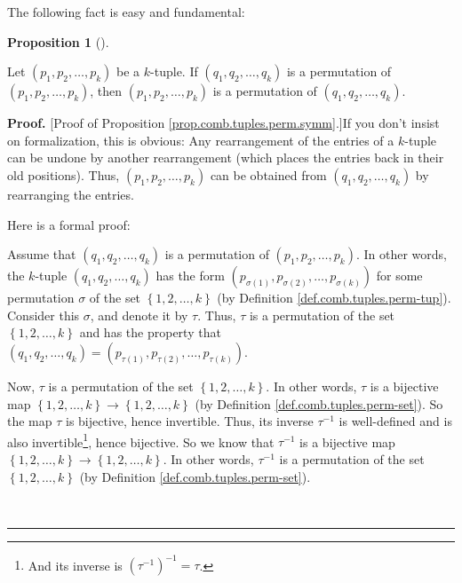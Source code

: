 \documentclass[numbers=enddot,12pt,final,onecolumn,notitlepage]{scrartcl}%
\numberwithin{exer}{subsection}
\theoremstyle{definition}
\newtheorem{prop}[theo]{Proposition}
\newenvironment{proposition}[1][]
{\begin{prop}[#1]\begin{leftbar}}
{\end{leftbar}\end{prop}}
\newenvironment{fineprint}{\begin{small}}{\end{small}}
\newenvironment{proof}[1][Proof]{\noindent\textbf{#1.} }{\ \rule{0.5em}{0.5em}}
\begin{document}
The following fact is easy and fundamental:

\begin{proposition}
\label{prop.comb.tuples.perm.symm}Let $\left(  p_{1},p_{2},\ldots
,p_{k}\right)  $ be a $k$-tuple. If $\left(  q_{1},q_{2},\ldots,q_{k}\right)
$ is a permutation of $\left(  p_{1},p_{2},\ldots,p_{k}\right)  $, then
$\left(  p_{1},p_{2},\ldots,p_{k}\right)  $ is a permutation of $\left(
q_{1},q_{2},\ldots,q_{k}\right)  $.
\end{proposition}

\begin{proof}
[Proof of Proposition \ref{prop.comb.tuples.perm.symm}.]If you don't insist on
formalization, this is obvious: Any rearrangement of the entries of a
$k$-tuple can be undone by another rearrangement (which places the entries
back in their old positions). Thus, $\left(  p_{1},p_{2},\ldots,p_{k}\right)
$ can be obtained from $\left(  q_{1},q_{2},\ldots,q_{k}\right)  $ by
rearranging the entries.

\begin{fineprint}
Here is a formal proof:

Assume that $\left(  q_{1},q_{2},\ldots,q_{k}\right)  $ is a permutation of
$\left(  p_{1},p_{2},\ldots,p_{k}\right)  $. In other words, the $k$-tuple
$\left(  q_{1},q_{2},\ldots,q_{k}\right)  $ has the form $\left(
p_{\sigma\left(  1\right)  },p_{\sigma\left(  2\right)  },\ldots
,p_{\sigma\left(  k\right)  }\right)  $ for some permutation $\sigma$ of the
set $\left\{  1,2,\ldots,k\right\}  $ (by Definition
\ref{def.comb.tuples.perm-tup}). Consider this $\sigma$, and denote it by
$\tau$. Thus, $\tau$ is a permutation of the set $\left\{  1,2,\ldots
,k\right\}  $ and has the property that $\left(  q_{1},q_{2},\ldots
,q_{k}\right)  =\left(  p_{\tau\left(  1\right)  },p_{\tau\left(  2\right)
},\ldots,p_{\tau\left(  k\right)  }\right)  $.

Now, $\tau$ is a permutation of the set $\left\{  1,2,\ldots,k\right\}  $. In
other words, $\tau$ is a bijective map $\left\{  1,2,\ldots,k\right\}
\rightarrow\left\{  1,2,\ldots,k\right\}  $ (by Definition
\ref{def.comb.tuples.perm-set}). So the map $\tau$ is bijective, hence
invertible. Thus, its inverse $\tau^{-1}$ is well-defined and is also
invertible\footnote{And its inverse is $\left(  \tau^{-1}\right)  ^{-1}=\tau
$.}, hence bijective. So we know that $\tau^{-1}$ is a bijective map $\left\{
1,2,\ldots,k\right\}  \rightarrow\left\{  1,2,\ldots,k\right\}  $. In other
words, $\tau^{-1}$ is a permutation of the set $\left\{  1,2,\ldots,k\right\}
$ (by Definition \ref{def.comb.tuples.perm-set}).


\end{fineprint}
\end{proof}
\end{document}
